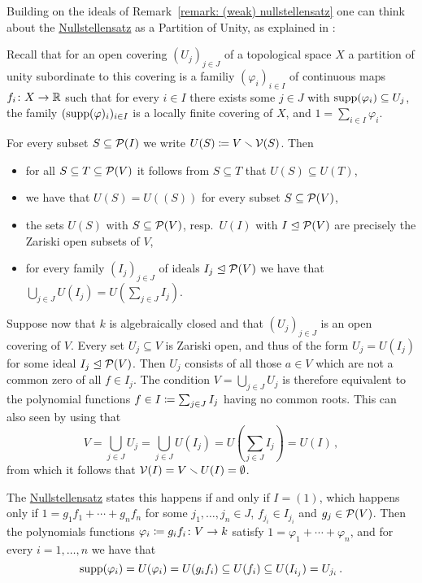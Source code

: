 \begin{remark}
  Building on the ideals of Remark~\ref{remark: (weak) nullstellensatz} one can think about the \hyperref[corollary: nullstellensatz]{Nullstellensatz} as a Partition of Unity, as explained in \cite{SBS}:
  
  Recall that for an open covering $(U_j)_{j \in J}$ of a topological space $X$ a partition of unity subordinate to this covering is a familiy $(\varphi_i)_{i \in I}$ of continuous maps $f_i \colon X \to \mathbb{R}$ such that for every $i \in I$ there exists some $j \in J$ with $\operatorname{supp}(\varphi_i) \subseteq U_j$, the family $(\operatorname{supp}(\varphi)_i)_{i \in I}$ is a locally finite covering of $X$, and $1 = \sum_{i \in I} \varphi_i$.
  
  For every subset $S \subseteq \mathcal{P}(I)$ we write $U(S) \coloneqq V \smallsetminus \mathcal{V}(S)$.
  Then
  \begin{itemize}
    \item
      for all $S \subseteq T \subseteq \mathcal{P}(V)$ it follows from $S \subseteq T$ that $U(S) \subseteq U(T)$,
    \item
      we have that $U(S) = U((S))$ for every subset $S \subseteq \mathcal{P}(V)$,
    \item
      the sets $U(S)$ with $S \subseteq \mathcal{P}(V)$, resp.\ $U(I)$ with $I \trianglelefteq \mathcal{P}(V)$ are precisely the Zariski open subsets of $V$,
    \item
      for every family $(I_j)_{j \in J}$ of ideals $I_j \trianglelefteq \mathcal{P}(V)$ we have that $\bigcup_{j \in J} U(I_j) = U( \sum_{j \in J} I_j )$.
  \end{itemize}
  
  Suppose now that $k$ is algebraically closed and that $(U_j)_{j \in J}$ is an open covering of $V$.
  Every set $U_j \subseteq V$ is Zariski open, and thus of the form $U_j = U(I_j)$ for some ideal $I_j \trianglelefteq \mathcal{P}(V)$.
  Then $U_j$ consists of all those $a \in V$ which are not a common zero of all $f \in I_j$.
  The condition $V = \bigcup_{j \in J} U_j$ is therefore equivalent to the polynomial functions $f \in I \coloneqq \sum_{j \in J} I_j$ having no common roots.
  This can also seen by using that
  \[
      V
    = \bigcup_{j \in J} U_j
    = \bigcup_{j \in J} U(I_j)
    = U\left( \sum_{j \in J} I_j \right)
    = U(I) \,,
  \]
  from which it follows that $\mathcal{V}(I) = V \smallsetminus U(I) = \emptyset$.
  
  The \hyperref[corollary: nullstellensatz]{Nullstellensatz} states this happens if and only if $I = (1)$, which happens only if $1 = g_1 f_1 + \dotsb + g_n f_n$ for some $j_1, \dotsc, j_n \in J$, $f_{j_i} \in I_{j_i}$ and $g_j \in \mathcal{P}(V)$.
  Then the polynomials functions $\varphi_i \coloneqq g_i f_i \colon V \to k$ satisfy $1 = \varphi_1 + \dotsb + \varphi_n$, and for every $i = 1, \dotsc, n$ we have that
  \[
              \operatorname{supp}( \varphi_i )
    =         U(\varphi_i)
    =         U(g_i f_i)
    \subseteq U(f_i)
    \subseteq U(I_{i_j})
    =         U_{j_i} \,.
  \]
\end{remark}


